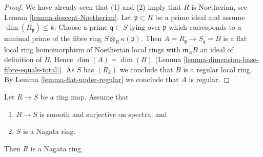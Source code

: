 \begin{proof}
We have already seen that (1) and (2) imply that $R$ is Noetherian,
see Lemma \ref{lemma-descent-Noetherian}.
Let $\mathfrak p \subset R$ be a prime ideal and assume
$\dim(R_{\mathfrak p}) \leq k$.
Choose a prime $\mathfrak q \subset S$ lying over $\mathfrak p$
which corresponds to a minimal prime of the fibre ring
$S \otimes_R \kappa(\mathfrak p)$. Then
$A = R_{\mathfrak p} \to S_{\mathfrak q} = B$ is a flat local ring
homomorphism of Noetherian local rings with $\mathfrak m_AB$ an
ideal of definition of $B$. Hence
$\dim(A) = \dim(B)$ (Lemma \ref{lemma-dimension-base-fibre-equals-total}).
As $S$ has $(R_k)$ we conclude that $B$ is a regular local ring.
By Lemma \ref{lemma-flat-under-regular} we conclude that $A$ is regular.
\end{proof}

\begin{lemma}
\label{lemma-descent-nagata}
Let $R \to S$ be a ring map. Assume that
\begin{enumerate}
\item $R \to S$ is smooth and surjective on spectra, and
\item $S$ is a Nagata ring.
\end{enumerate}
Then $R$ is a Nagata ring.
\end{lemma}

